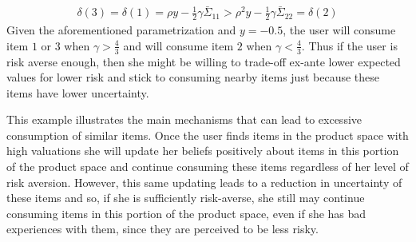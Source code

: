 \documentclass{article}
\begin{document}
\begin{align*}
\delta(3) = \delta(1) = \rho y - \frac{1}{2} \gamma \bar{\Sigma}_{11} > \rho^{2} y - \frac{1}{2} \gamma \bar{\Sigma}_{22} = \delta(2)
\end{align*}
Given the aforementioned parametrization and $y = -0.5$, the user will consume item $1$ or $3$ when $\gamma > \frac{4}{3}$ and will consume item $2$ when $\gamma < \frac{4}{3}$. Thus if the user is risk averse enough, then she might be willing to trade-off ex-ante lower expected values for lower risk and stick to consuming nearby items just because these items have lower uncertainty. 
\par 
This example illustrates the main mechanisms that can lead to excessive consumption of similar items. Once the user finds items in the product space with high valuations she will update her beliefs positively about items in this portion of the product space and continue consuming these items regardless of her level of risk aversion. However, this same updating leads to a reduction in uncertainty of these items and so, if she is sufficiently risk-averse, she still may continue consuming items in this portion of the product space, even if she has bad experiences with them, since they are perceived to be less risky. 
\par
\end{document}
